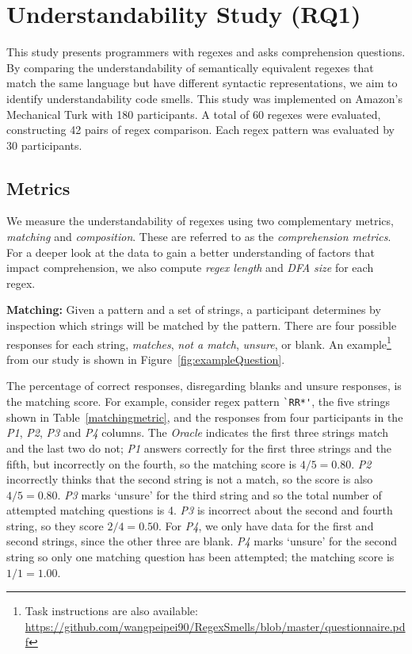 

\section{Understandability Study (RQ1)}
\label{sec:rq1}
This study presents programmers with regexes and asks comprehension questions. By comparing the understandability of semantically equivalent regexes that match the same language but have different syntactic representations, we aim to identify understandability code smells.
This study was implemented on Amazon's Mechanical Turk with 180 participants. A total of 60 regexes were evaluated, constructing 42 pairs of regex comparison. Each regex pattern was evaluated by 30 participants.







\subsection{Metrics}
\label{sec:understadningmetric}
 We measure the understandability of regexes using two complementary metrics, \emph{matching} and \emph{composition}. These are referred to as the \emph{comprehension metrics}.
For a deeper look at the data to gain a better understanding of factors that impact comprehension, we also compute \emph{regex length} and \emph{DFA size} for each regex.


\textbf{Matching:}
 Given a pattern and a set of strings, a participant determines by inspection which strings will be matched by the pattern. There are four possible responses for each string, \emph{matches}, \emph{not a match}, \emph{unsure}, or blank. An example\footnote{Task instructions are also available: \url{https://github.com/wangpeipei90/RegexSmells/blob/master/questionnaire.pdf}} from our study is shown in Figure~\ref{fig:exampleQuestion}.

 The percentage of correct responses, disregarding blanks and unsure responses, is the matching score.
 For example, consider regex pattern \verb!`RR*'!, the five strings shown in Table~\ref{matchingmetric}, and the responses from four participants in the \emph{P1}, \emph{P2}, \emph{P3} and \emph{P4} columns.
 The {\em Oracle} indicates the first three strings match and the last two do not; 
 \emph{P1} answers correctly for the first three strings and the fifth, but incorrectly on the fourth, so the matching score is $4/5 = 0.80$. \emph{P2} incorrectly thinks that the second string is not a match, so the score is also $4/5 = 0.80$. \emph{P3} marks `unsure' for the third string and so the total number of attempted matching questions is 4. \emph{P3} is incorrect about the second and fourth string, so they score $2/4 = 0.50$. For \emph{P4}, we only have data for the first and second strings, since the other three are blank. \emph{P4} marks `unsure' for the second string so only one matching question has been attempted; the matching score is $1/1 = 1.00$.

